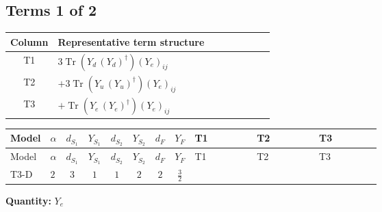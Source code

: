 \documentclass[8pt]{article}
\begin{document}
\begin{landscape}
\subsection*{Terms 1 of 2}
\begin{center}
\begin{tabular}{@{}c >{\raggedright\arraybackslash}p{0.82\linewidth}@{}}
\toprule
Column & Representative term structure \\
\midrule
T1 & \(\displaystyle 3 \operatorname{Tr}\!\left({Y_d}\,\left({Y_d}\right)^{\dagger}\right) \left({Y_e}\right)_{ij}\) \\
\midrule
T2 & \(\displaystyle +3 \operatorname{Tr}\!\left({Y_u}\,\left({Y_u}\right)^{\dagger}\right) \left({Y_e}\right)_{ij}\) \\
\midrule
T3 & \(\displaystyle +\operatorname{Tr}\!\left({Y_e}\,\left({Y_e}\right)^{\dagger}\right) \left({Y_e}\right)_{ij}\) \\
\midrule
\bottomrule
\end{tabular}
\end{center}
\smallskip
\tiny
\begin{longtable}{@{}llcccccc >{\raggedright\arraybackslash}p{0.21\linewidth} >{\raggedright\arraybackslash}p{0.21\linewidth} >{\raggedright\arraybackslash}p{0.21\linewidth}@{}}
\toprule
Model & $\alpha$ & $d_{S_1}$ & $Y_{S_1}$ & $d_{S_2}$ & $Y_{S_2}$ & $d_F$ & $Y_F$ & T1 & T2 & T3 \\
\midrule
\endfirsthead
\toprule
Model & $\alpha$ & $d_{S_1}$ & $Y_{S_1}$ & $d_{S_2}$ & $Y_{S_2}$ & $d_F$ & $Y_F$ & T1 & T2 & T3 \\
\midrule
\endhead
T3-D & $2$ & $3$ & $1$ & $1$ & $2$ & $2$ & $\frac{3}{2}$ & \scriptsize\adjustbox{max width=\linewidth}{$\begin{gathered} 3 \operatorname{Tr}\!\left({Y_d}\,\left({Y_d}\right)^{\dagger}\right) \left({Y_e}\right)_{ij}\end{gathered}$} & \scriptsize\adjustbox{max width=\linewidth}{$\begin{gathered} +3 \operatorname{Tr}\!\left({Y_u}\,\left({Y_u}\right)^{\dagger}\right) \left({Y_e}\right)_{ij}\end{gathered}$} & \scriptsize\adjustbox{max width=\linewidth}{$\begin{gathered} +\operatorname{Tr}\!\left({Y_e}\,\left({Y_e}\right)^{\dagger}\right) \left({Y_e}\right)_{ij}\end{gathered}$} \\
\midrule
\bottomrule
\end{longtable}
\clearpage
\noindent\textbf{Quantity: }$Y_e$\par\smallskip

\end{landscape}
\end{document}

